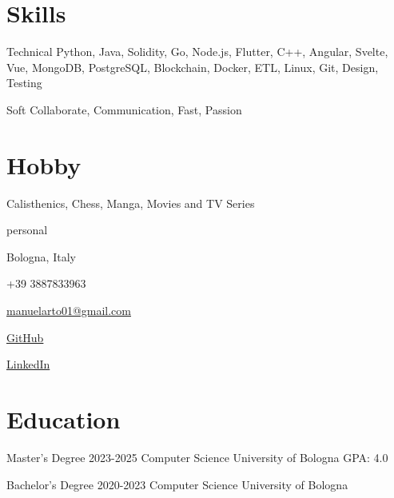 \documentclass{tccv}
\begin{document}
\section{Skills}

\begin{factlist}

\item{Technical}
     {Python, Java, Solidity, Go, Node.js, Flutter, C++, Angular, Svelte, Vue, MongoDB, PostgreSQL, Blockchain, Docker, ETL, Linux, Git, Design, Testing}

\item{Soft}
     {Collaborate, Communication, Fast, Passion}

\end{factlist}


\section{Hobby}

Calisthenics, Chess, Manga, Movies and TV Series


\newpage


\begin{keyvaluelist}{personal}
    \item[\faHome] Bologna, Italy
    \item[\faPhone] +39 3887833963
    \item[\faEnvelope] \href{mailto:manuelarto01@gmail.com}{manuelarto01@gmail.com}
    \item[\faGithub] \href{https://github.com/manuelarto}{GitHub}
    \item[\faLinkedin] \href{https://www.linkedin.com/in/manuel-arto-696012203/}{LinkedIn}
\end{keyvaluelist}


\section{Education}

\begin{yearlist}

\item[Master's Degree]{2023-2025}
     {Computer Science}
     {University of Bologna \newline GPA: 4.0}

\item[Bachelor's Degree]{2020-2023}
    {Computer Science}
    {University of Bologna}

\end{yearlist}
\end{document}
